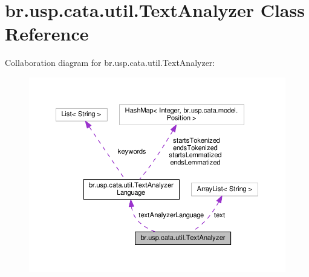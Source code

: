 \hypertarget{classbr_1_1usp_1_1cata_1_1util_1_1_text_analyzer}{\section{br.\+usp.\+cata.\+util.\+Text\+Analyzer Class Reference}
\label{classbr_1_1usp_1_1cata_1_1util_1_1_text_analyzer}
}


Collaboration diagram for br.\+usp.\+cata.\+util.\+Text\+Analyzer\+:\nopagebreak
\begin{figure}[H]
\begin{center}
\leavevmode
\includegraphics[width=350pt]{classbr_1_1usp_1_1cata_1_1util_1_1_text_analyzer__coll__graph}
\end{center}
\end{figure}
